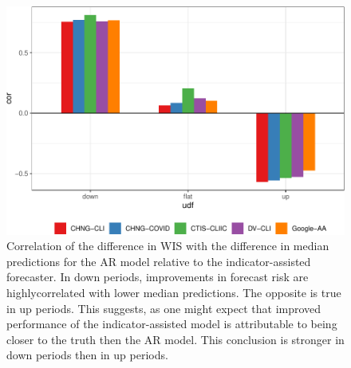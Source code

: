 \clearpage

\clearpage

\begin{figure}

{\centering \includegraphics[width=\textwidth]{fig/upswing-corr-table-1} 

}

\caption{Correlation of the difference in WIS with the difference in median predictions for the AR model relative to the indicator-assisted forecaster. In down periods, improvements in forecast risk are highlycorrelated with lower median predictions. The opposite is true in up periods. This suggests, as one might expect that improved performance of the indicator-assisted model is attributable to being closer to the truth then the AR model. This conclusion is stronger in down periods then in up periods.}\label{fig:upswing-corr-table}
\end{figure}

\clearpage

